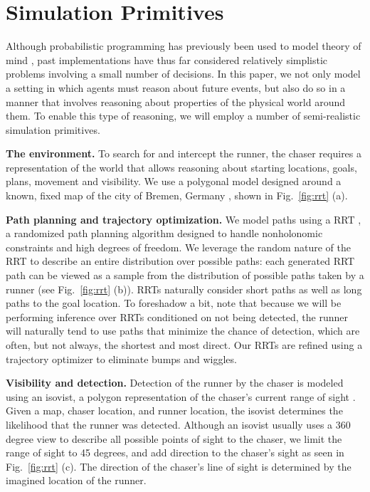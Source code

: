 \documentclass[twoside]{article}
\begin{document}
\section{Simulation Primitives}

Although probabilistic programming has previously been used to model theory of mind \cite{stuhlmuller2014reasoning}, past implementations have thus far considered relatively simplistic problems involving a small number of decisions. In this paper, we not only model a setting in which agents must reason about future events, but also do so in a manner that involves reasoning about properties of the physical world around them. To enable this type of reasoning, we will employ a number of semi-realistic simulation primitives.

\textbf{The environment.}  To search for and intercept the runner, the
chaser requires a representation of the world that allows reasoning
about starting locations, goals, plans, movement and visibility. We
use a polygonal model designed around a known, fixed map of the city of
Bremen, Germany \cite{BremenPointCloud}, shown in Fig.~\ref{fig:rrt} (a).

\textbf{Path planning and trajectory optimization.}  We model paths
using a RRT
\cite{lavalle1998rapidly}, a randomized path planning algorithm
designed to handle nonholonomic constraints and high degrees of
freedom.  We leverage the random nature of the RRT to describe an
entire distribution over possible paths: each generated RRT path can
be viewed as a sample from the distribution of possible paths taken by
a runner (see Fig.~\ref{fig:rrt} (b)). RRTs naturally consider short
paths as well as long paths to the goal location. To foreshadow a bit,
note that because we will be performing inference over RRTs
conditioned on not being detected, the runner will naturally tend to
use paths that minimize the chance of detection, which are often, but
not always, the shortest and most direct.  Our RRTs are
refined using a trajectory optimizer to eliminate bumps
and wiggles.

\textbf{Visibility and detection.}  Detection of the runner by the
chaser is modeled using an isovist, a polygon
representation of the chaser's current range of sight
\cite{isovist79,morariu2007human}. Given a map, chaser location, and
runner location, the isovist determines the likelihood
that the runner was detected. Although an isovist usually uses a 360
degree view to describe all possible points of sight to the chaser, we
limit the range of sight to 45
degrees, and add direction to the chaser's sight as seen in
Fig.~\ref{fig:rrt} (c). The direction of the chaser's line of sight is determined by the imagined location of the runner.
\end{document}
